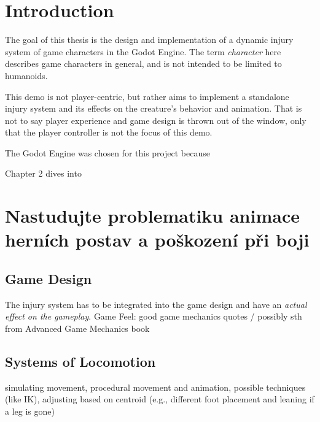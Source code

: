 
% 

\chapter{Introduction}

The goal of this thesis is the design and implementation of a dynamic injury system of game characters in the Godot Engine. The term \emph{character} here describes game characters in general, and is not intended to be limited to humanoids.

This demo is not player-centric, but rather aims to implement a standalone injury system and its effects on the creature's behavior and animation. That is not to say player experience and game design is thrown out of the window, only that the player controller is not the focus of this demo.

The Godot Engine was chosen for this project because 

Chapter 2 dives into 


\chapter{Nastudujte problematiku animace herních postav a poškození při boji}

\section{Game Design}
The injury system has to be integrated into the game design and have an \emph{actual effect on the gameplay}.
Game Feel: good game mechanics quotes / possibly sth from Advanced Game Mechanics book

\section{Systems of Locomotion}
simulating movement, procedural movement and animation, possible techniques (like IK), adjusting based on centroid (e.g., different foot placement and leaning if a leg is gone)

